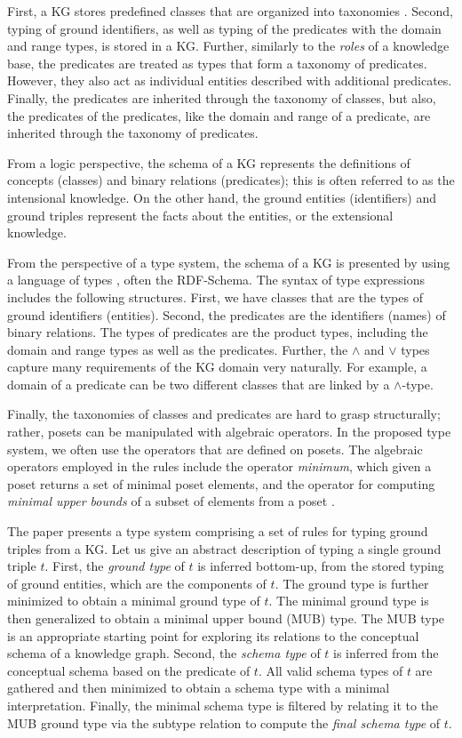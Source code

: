 \documentclass[runningheads]{llncs}
\begin{document}
First, a KG stores predefined classes that are organized into
taxonomies \cite{Baader2002}. Second, typing of ground identifiers, as
well as typing of the predicates with the domain and range types, is
stored in a KG. Further, similarly to the \emph{roles}
\cite{Brachman1985} of a knowledge base, the predicates are treated as
types that form a taxonomy of predicates. However, they also act as
individual entities described with additional predicates. Finally, the
predicates are inherited through the taxonomy of classes, but also,
the predicates of the predicates, like the domain and range of a
predicate, are inherited through the taxonomy of predicates.

From a logic perspective, the schema of a KG represents the
definitions of concepts (classes) and binary relations (predicates);
this is often referred to as the intensional knowledge. On the other
hand, the ground entities (identifiers) and ground triples represent
the facts about the entities, or the extensional knowledge.

From the perspective of a type system, the schema of a KG is presented
by using a language of types \cite{Pierce2002}, often the
RDF-Schema. The syntax of type expressions includes the following
structures. First, we have classes that are the types of ground
identifiers (entities). Second, the predicates are the identifiers
(names) of binary relations. The types of predicates are the product
types, including the domain and range types as well as the
predicates. Further, the $\land$ and $\lor$ types \cite{Pierce1996}
capture many requirements of the KG domain very naturally. For
example, a domain of a predicate can be two different classes that are
linked by a $\land$-type.

Finally, the taxonomies of classes and predicates are hard to grasp
structurally; rather, posets can be manipulated with algebraic
operators. In the proposed type system, we often use the operators that
are defined on posets. The algebraic operators employed in the rules
include the operator \emph{minimum}, which given a poset returns a set
of minimal poset elements, and the operator for computing
\emph{minimal upper bounds} of a subset of elements from a poset
\cite{DaveyPriestley2002}.

The paper presents a type system comprising a set of rules for typing
ground triples from a KG. Let us give an abstract description of
typing a single ground triple $t$. First, the \emph{ground type} of
$t$ is inferred bottom-up, from the stored typing of ground
entities, which are the components of $t$. The ground type is further
minimized to obtain a minimal ground type of $t$. The minimal ground
type is then generalized to obtain a minimal upper bound (MUB)
type. The MUB type is an appropriate starting point for exploring its
relations to the conceptual schema of a knowledge graph. Second, the
\emph{schema type} of $t$ is inferred from the conceptual schema based
on the predicate of $t$. All valid schema types of $t$ are gathered
and then minimized to obtain a schema type with a minimal
interpretation. Finally, the minimal schema type is filtered by
relating it to the MUB ground type via the subtype relation to compute
the \emph{final schema type} of $t$.
\end{document}
